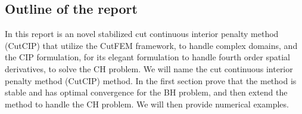 \subsection{Outline of the report}%
\label{sub:outline_of_the_report}

In this report is an novel stabilized cut continuous interior penalty method (CutCIP) that utilize the CutFEM framework, to handle complex domains, and the CIP formulation, for its elegant formulation to handle fourth order spatial derivatives, to solve
the CH problem. We will name the cut continuous interior penalty method (CutCIP) method. In the first section  prove that the method is stable and has optimal
convergence for the BH problem, and then extend the method to handle the CH problem. We will then provide numerical examples.

